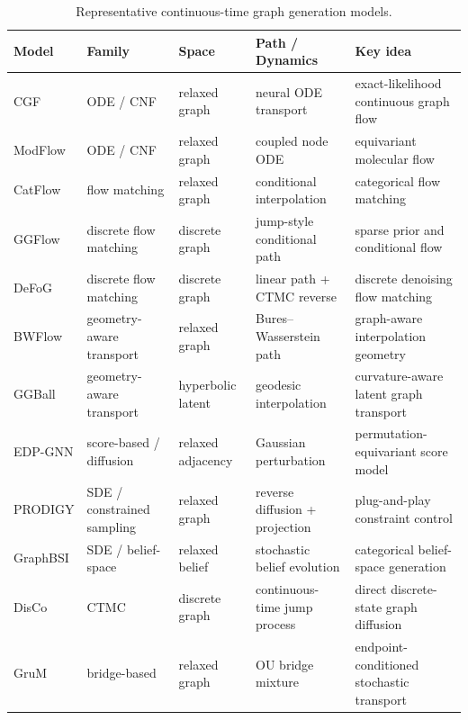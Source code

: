 \documentclass{article}
\begin{document}
\begin{table}[http]
\centering
\footnotesize
\renewcommand{\arraystretch}{1.1}
\setlength{\tabcolsep}{4pt}
\begin{tabularx}{\textwidth}{@{}
>{\raggedright\arraybackslash}p{1.6cm}
>{\raggedright\arraybackslash}p{2.8cm}
>{\raggedright\arraybackslash}p{2.2cm}
>{\raggedright\arraybackslash}p{2.6cm}
>{\raggedright\arraybackslash}X
@{}}
\toprule
\textbf{Model} & \textbf{Family} & \textbf{Space} & \textbf{Path / Dynamics} & \textbf{Key idea} \\
\midrule
CGF       & ODE / CNF                  & relaxed graph     & neural ODE transport            & exact-likelihood continuous graph flow \\
ModFlow   & ODE / CNF                  & relaxed graph     & coupled node ODE                & equivariant molecular flow \\
CatFlow   & flow matching              & relaxed graph     & conditional interpolation       & categorical flow matching \\
GGFlow    & discrete flow matching     & discrete graph    & jump-style conditional path     & sparse prior and conditional flow \\
DeFoG     & discrete flow matching     & discrete graph    & linear path + CTMC reverse      & discrete denoising flow matching \\
BWFlow    & geometry-aware transport   & relaxed graph     & Bures--Wasserstein path         & graph-aware interpolation geometry \\
GGBall    & geometry-aware transport   & hyperbolic latent & geodesic interpolation          & curvature-aware latent graph transport \\
EDP-GNN   & score-based / diffusion    & relaxed adjacency & Gaussian perturbation           & permutation-equivariant score model \\
PRODIGY   & SDE / constrained sampling & relaxed graph     & reverse diffusion + projection  & plug-and-play constraint control \\
GraphBSI  & SDE / belief-space         & relaxed belief    & stochastic belief evolution     & categorical belief-space generation \\
DisCo     & CTMC                       & discrete graph    & continuous-time jump process    & direct discrete-state graph diffusion \\
GruM      & bridge-based               & relaxed graph     & OU bridge mixture               & endpoint-conditioned stochastic transport \\
\bottomrule
\end{tabularx}
\caption{Representative continuous-time graph generation models.}
\label{tab:continuous_time_models}
\end{table}
\end{document}
